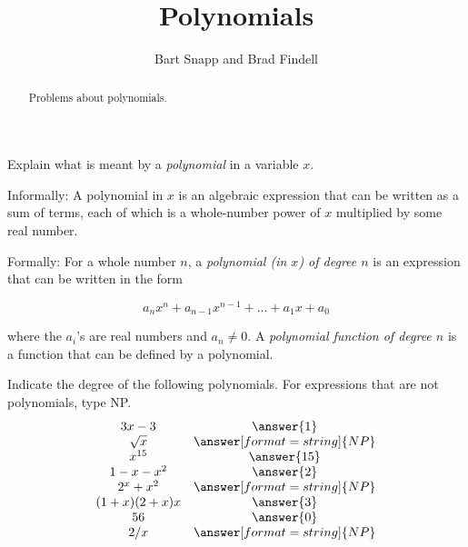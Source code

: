\documentclass[nooutcomes]{ximera}
\title{Polynomials}
\author{Bart Snapp and Brad Findell}
\begin{document}
\begin{abstract}
Problems about polynomials.
\end{abstract}
\maketitle

\begin{problem}Explain what is meant by a \textit{polynomial} in a variable $x$.  
\begin{freeResponse}
\begin{hint}
Informally: A polynomial in $x$ is an algebraic expression that can be written as a sum of terms, each of which is a whole-number power of $x$ multiplied by some real number.  

Formally: For a whole number $n$, a \emph{polynomial (in $x$) of degree $n$} is an expression that can be written in the form 

$$a_nx^n+a_{n-1}x^{n-1}+\dots+a_1x + a_0$$

where the $a_i$'s are real numbers and $a_n\ne 0$.  
A \emph{polynomial function of degree $n$} is a function that can be defined by a polynomial.  

\end{hint}
\end{freeResponse}
\end{problem} 


\begin{problem}
Indicate the degree of the following polynomials.  For expressions that are not polynomials, type NP.
\[
\begin{array}{cc}
 3x-3 &     \answer{1} \\
 \sqrt{x} & \answer[format=string]{NP} \\
 x^{15}  & \answer{15} \\
 1-x-x^2 & \answer{2} \\
 2^x + x^2     & \answer[format=string]{NP} \\
 (1+x)(2+x)x & \answer{3} \\
 56      & \answer{0} \\
 2/x & \answer[format=string]{NP}  
\end{array}
\]
\end{problem}
\end{document}
